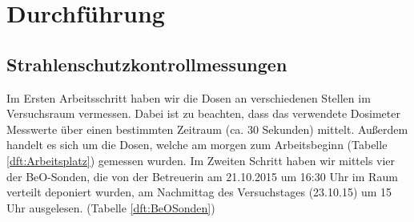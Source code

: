 \section{Durchführung}

\subsection{Strahlenschutzkontrollmessungen}
Im Ersten Arbeitsschritt haben wir die Dosen an verschiedenen Stellen im Versuchsraum vermessen. Dabei ist zu beachten, dass das verwendete Dosimeter Messwerte über einen bestimmten Zeitraum (ca. 30 Sekunden) mittelt. Außerdem handelt es sich um die Dosen, welche am morgen zum Arbeitsbeginn (Tabelle \ref{dft:Arbeitsplatz}) gemessen wurden. 
Im Zweiten Schritt haben wir mittels vier der BeO-Sonden, die von der Betreuerin am 21.10.2015 um 16:30 Uhr im Raum verteilt deponiert wurden, am Nachmittag des Versuchstages (23.10.15) um 15 Uhr ausgelesen. (Tabelle \ref{dft:BeOSonden}) \\
	
